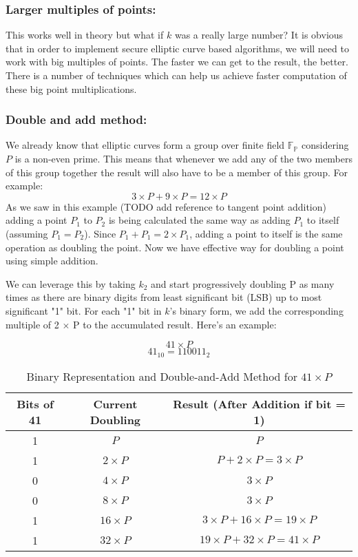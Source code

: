 \documentclass[bp,en]{FEIstyle}
\begin{document}
\subsubsection*{Larger multiples of points:}
This works well in theory but what if $k$ was a really large number? It is obvious that in order to implement secure elliptic curve based algorithms, we will need to work with big multiples of points. The faster we can get to the result, the better. There is a number of techniques which can help us achieve faster computation of these big point multiplications.


\subsubsection*{Double and add method:}
We already know that elliptic curves form a group over finite field $\mathbb{F}_\mathbb{P}$ considering $P$ is a non-even prime. This means that whenever we add any of the two members of this group together the result will also have to be a member of this group. For example:
\[
3 \times P + 9 \times P = 12 \times P
\]
As we saw in this example (TODO add reference to tangent point addition) adding a point $P_1$ to $P_2$ is being calculated the same way as adding $P_1$ to itself (assuming $P_1=P_2$). Since $P_1+P_1=2\times P_1$, adding a point to itself is the same operation as doubling the point. Now we have effective way for doubling a point using simple addition. 

We can leverage this by taking $k_2$ and start progressively doubling P as many times as there are binary digits from least significant bit (LSB) up to most significant "1" bit. For each "1" bit in $k$'s binary form, we add the corresponding multiple of 2 $\times$ P to the accumulated result. Here's an example:

\[
41 \times P 
\]
\[
41_{10} = 110011_2  
\]
\begin{table}[H]
\centering
\begin{tabular}{|c|c|c|}
\hline
\textbf{Bits of 41} & \textbf{Current Doubling} & \textbf{Result (After Addition if bit = 1)} \\ \hline
1 & $P$ & $P$ \\ \hline
1 & $2\times P$ & $P+2\times P=3\times P$ \\ \hline
0 & $4\times P$ & $3\times P$ \\ \hline
0 & $8\times P$ & $3\times P$ \\ \hline
1 & $16\times P$ & $3\times P+16\times P=19\times P$ \\ \hline
1 & $32\times P$ & $19\times P+32\times P=41\times P$ \\ \hline
\end{tabular}
\caption{Binary Representation and Double-and-Add Method for $41 \times P$}\end{table}
\end{document}

